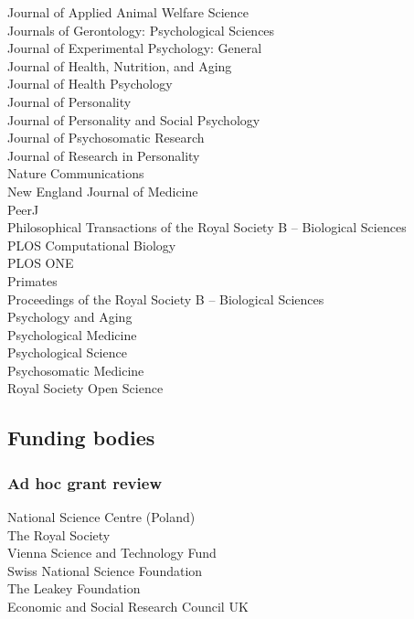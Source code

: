 \documentclass[11pt]{article}
\begin{document}
\begin{minipage}[t]{0.49\linewidth}
Journal of Applied Animal Welfare Science \\
Journals of Gerontology: Psychological Sciences \\
Journal of Experimental Psychology: General \\
Journal of Health, Nutrition, and Aging \\
Journal of Health Psychology \\
Journal of Personality \\
Journal of Personality and Social Psychology \\
Journal of Psychosomatic Research \\
Journal of Research in Personality \\
Nature Communications \\
New England Journal of Medicine \\
PeerJ \\
Philosophical Transactions of the Royal Society B -- Biological Sciences \\
PLOS Computational Biology \\
PLOS ONE \\
Primates \\
Proceedings of the Royal Society B -- Biological Sciences \\
Psychology and Aging \\
Psychological Medicine \\
Psychological Science \\
Psychosomatic Medicine \\
Royal Society Open Science
\end{minipage}

\subsection*{Funding bodies}

\subsubsection*{Ad hoc grant review}
National Science Centre (Poland) \\
The Royal Society \\
Vienna Science and Technology Fund \\
Swiss National Science Foundation \\
The Leakey Foundation \\
Economic and Social Research Council UK
\end{document}
